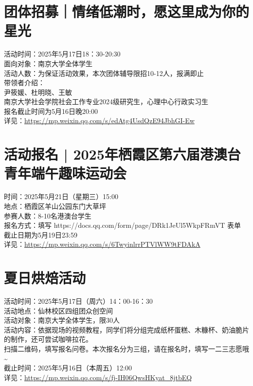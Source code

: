 \documentclass[letterpaper, 12pt]{article}
\begin{document}
\begin{multicols}{2}
\section{团体招募｜情绪低潮时，愿这里成为你的星光} %
活动时间：2025年5月17日18：30-20:30
\\面向对象：南京大学全体学生
\\活动人数：为保证活动效果，本次团体辅导限招10-12人，报满即止
\\带领者介绍：
\\尹筱媛、杜明晓、王敏 
\\南京大学社会学院社会工作专业2024级研究生，心理中心行政实习生
\\报名截止时间为5月16日晚20:00
\\详见：\url{https://mp.weixin.qq.com/s/edAtg4UsdQzE94JbhGI-Ew}

\section{活动报名 | 2025年栖霞区第六届港澳台青年端午趣味运动会} %
时间：2025年5月21日（星期三）15:00 
\\地点：栖霞区羊山公园东门大草坪
\\参赛人数：8-10名港澳台学生
\\报名方式：填写 https://docs.qq.com/form/page/DRk1JeUl5WkpFRmVT 表单
\\截止日期为5月19日23:59
\\详见：\url{https://mp.weixin.qq.com/s/6TwyinlrrPTVlWW9tFDAkA}

\section{夏日烘焙活动} %
活动时间：2025年5月17日（周六）14：00-16：30
\\活动地点：仙林校区四组团众创空间
\\活动对象：南京大学全体学生，限30人
\\活动内容：依据现场的视频教程，同学们将分组完成纸杯蛋糕、木糠杯、奶油脆片的制作，还可尝试咖啡拉花。
\\扫描二维码，填写报名问卷。本次报名分为三组，请在报名时，填写一二三志愿哦\textasciitilde{}
\\截止时间：2025年5月16日（本周五）12:00
\\详见：\url{https://mp.weixin.qq.com/s/fj-IH06QwsHKyat_8jtbEQ}

\end{multicols}
\end{document}
